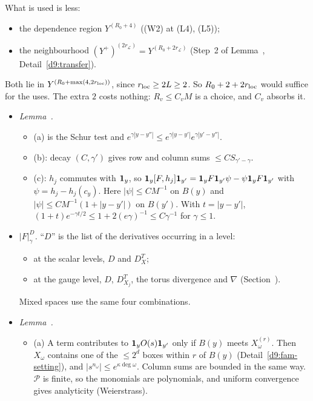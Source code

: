 \begin{detail}
\begin{step}
What is used is less:
\begin{itemize}
\item the dependence region $Y^{(R_0+4)}$ ((W2) at (L4), (L5));
\item the neighbourhood $(Y^+)^{(2r_{\mathcal L})}=Y^{(R_0+2r_{\mathcal L})}$ (Step~2 of Lemma~, Detail~\ref{d9:transfer}).
\end{itemize}
Both lie in $Y^{(R_0+\max(4,2r_{\rm loc}))}$, since $r_{\rm loc}\ge2L\ge2$. So $R_0+2+2r_{\rm loc}$ would suffice for the uses. The extra $2$ costs nothing: $R_v\le C_vM$ is a choice, and $C_v$ absorbs it.
\end{step}
\end{detail}

\begin{detail}\label{d9:decay}
\begin{itemize}
\item \emph{Lemma~.}
\begin{itemize}
\item (a) is the Schur test and $e^{\gamma|y-y''|}\le e^{\gamma|y-y'|}e^{\gamma|y'-y''|}$.
\item (b): decay $(C,\gamma')$ gives row and column sums $\le CS_{\gamma'-\gamma}$.
\item (c): $h_j$ commutes with $\mathbf 1_y$, so $\mathbf 1_y[F,h_j]\mathbf 1_{y'}=\mathbf 1_yF\mathbf 1_{y'}\psi-\psi\mathbf 1_yF\mathbf 1_{y'}$ with $\psi=h_j-h_j(c_y)$. Here $|\psi|\le CM^{-1}$ on $B(y)$ and $|\psi|\le CM^{-1}(1+|y-y'|)$ on $B(y')$. With $t=|y-y'|$, $(1+t)e^{-\gamma t/2}\le1+2(e\gamma)^{-1}\le C\gamma^{-1}$ for $\gamma\le1$.
\end{itemize}
\item \emph{$|F|^D_\gamma$.} ``$D$'' is the list of the derivatives occurring in a level:
\begin{itemize}
\item at the scalar levels, $D$ and $D^T_X$;
\item at the gauge level, $D$, $D^T_{X_j}$, the torus divergence and $\nabla$ (Section~).
\end{itemize}
Mixed spaces use the same four combinations.
\item \emph{Lemma~.}
\begin{itemize}
\item (a) A term contributes to $\mathbf 1_yO(s)\mathbf 1_{y'}$ only if $B(y)$ meets $X^{(r)}_\omega$. Then $X_\omega$ contains one of the $\le2^d$ boxes within $r$ of $B(y)$ (Detail~\ref{d9:fam-setting}), and $|s^{n_\omega}|\le e^{\kappa\deg\omega}$. Column sums are bounded in the same way. $\mathcal P$ is finite, so the monomials are polynomials, and uniform convergence gives analyticity (Weierstrass).

\end{itemize}
\end{itemize}
\end{detail}
